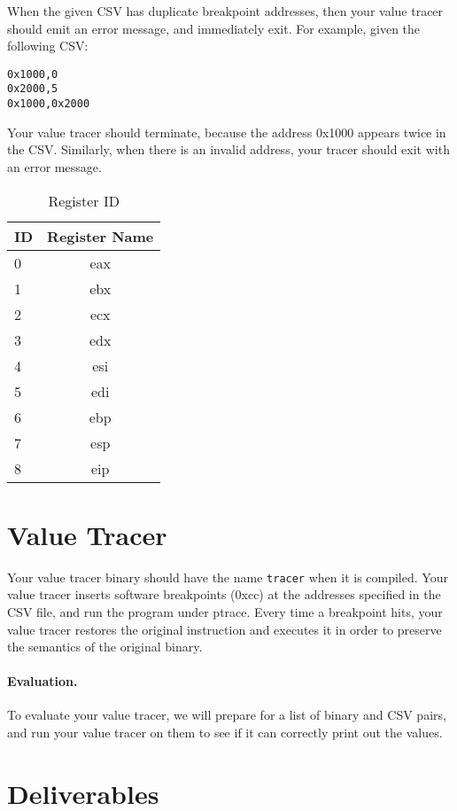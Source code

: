 \documentclass[a4paper, 11pt]{article}
\theoremstyle{definition}
\begin{document}
{When the given CSV has duplicate breakpoint addresses, then your value
tracer should emit an error message, and immediately exit. For
example, given the following CSV:
\begin{verbatim}
0x1000,0
0x2000,5
0x1000,0x2000
\end{verbatim}
%
Your value tracer should terminate, because the address 0x1000 appears
twice in the CSV. Similarly, when there is an invalid address, your
tracer should exit with an error message.

\begin{table}[h]
  \centering
  \begin{tabular}{lc}
    ID & Register Name \\\hline
    0 & eax \\
    1 & ebx \\
    2 & ecx \\
    3 & edx \\
    4 & esi \\
    5 & edi \\
    6 & ebp \\
    7 & esp \\
    8 & eip \\\hline
  \end{tabular}
  \caption{Register ID}
  \label{tab:regid}
\end{table}

\section{Value Tracer}

Your value tracer binary should have the name \texttt{tracer} when it
is compiled. Your value tracer inserts software breakpoints (0xcc) at
the addresses specified in the CSV file, and run the program under
ptrace. Every time a breakpoint hits, your value tracer restores the
original instruction and executes it in order to preserve the
semantics of the original binary.

\paragraph{Evaluation.} To evaluate your value tracer, we will prepare
for a list of binary and CSV pairs, and run your value tracer on them
to see if it can correctly print out the values.

\section{Deliverables}

}
\end{document}
